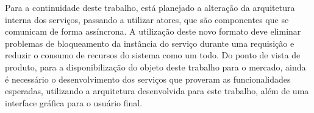 Para a continuidade deste trabalho, está planejado a alteração da arquitetura
interna dos serviços, passando a utilizar atores, que são componentes que
se comunicam de forma assíncrona. A utilização deste novo formato deve
eliminar problemas de bloqueamento da instância do serviço durante uma
requisição e reduzir o consumo de recursos do sistema como um todo. Do
ponto de vista de produto, para a disponibilização do objeto deste trabalho
para o mercado, ainda é necessário o desenvolvimento dos serviços que
proveram as funcionalidades esperadas, utilizando a arquitetura desenvolvida
para este trabalho, além de uma interface gráfica para o usuário final.
